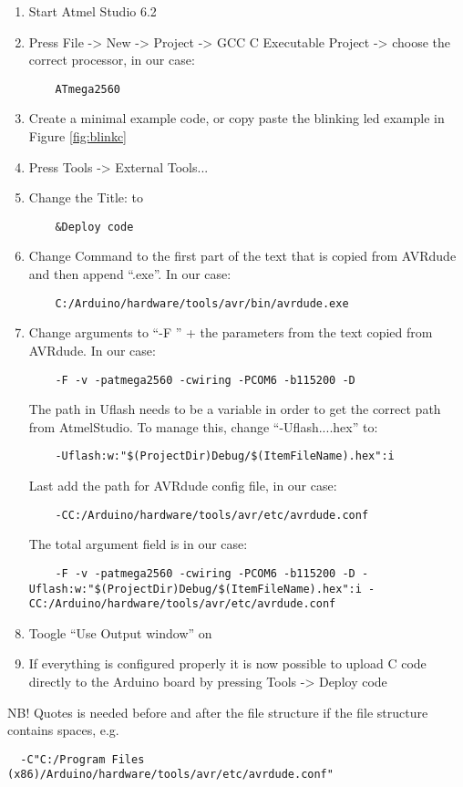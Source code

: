 \begin{enumerate}
    \item Start Atmel Studio 6.2
    \item Press File -> New -> Project -> GCC C Executable Project -> choose the correct processor, in our case:
    \begin{lstlisting}
    ATmega2560
    \end{lstlisting}
    \item Create a minimal example code, or copy paste the blinking led example in Figure \ref{fig:blinkc}
    \item Press Tools -> External Tools...
    \item Change the Title: to 
    \begin{lstlisting}
    &Deploy code
    \end{lstlisting}
    \item Change Command to the first part of the text that is copied from AVRdude and then append ``.exe''. In our case:
    \begin{lstlisting}
    C:/Arduino/hardware/tools/avr/bin/avrdude.exe
    \end{lstlisting}
    \item Change arguments to ``-F '' + the parameters from the text copied from AVRdude. In our case:
    \begin{lstlisting}
    -F -v -patmega2560 -cwiring -PCOM6 -b115200 -D 
    \end{lstlisting}
    The path in Uflash needs to be a variable in order to get the correct path from AtmelStudio. To manage this, change ``-Uflash....hex'' to:
    \begin{lstlisting}
    -Uflash:w:"$(ProjectDir)Debug/$(ItemFileName).hex":i
    \end{lstlisting}
    Last add the path for AVRdude config file, in our case:
    \begin{lstlisting}
    -CC:/Arduino/hardware/tools/avr/etc/avrdude.conf
    \end{lstlisting}
    
    
    The total argument field is in our case:
    \begin{lstlisting}
    -F -v -patmega2560 -cwiring -PCOM6 -b115200 -D -Uflash:w:"$(ProjectDir)Debug/$(ItemFileName).hex":i -CC:/Arduino/hardware/tools/avr/etc/avrdude.conf
    \end{lstlisting}
    
    \item Toogle ``Use Output window'' on
    \item If everything is configured properly it is now possible to upload C code directly to the Arduino board by pressing Tools -> Deploy code
\end{enumerate}
NB! Quotes is needed before and after the file structure if the file structure contains spaces, e.g.
\begin{lstlisting}
  -C"C:/Program Files (x86)/Arduino/hardware/tools/avr/etc/avrdude.conf"
\end{lstlisting}


